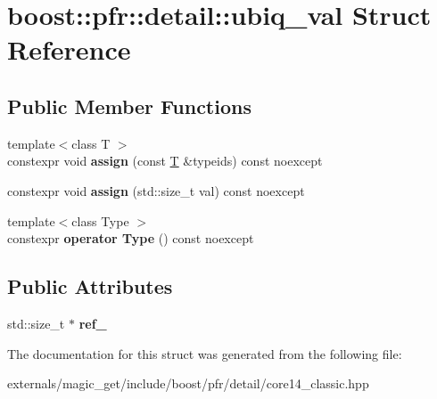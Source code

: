 \hypertarget{structboost_1_1pfr_1_1detail_1_1ubiq__val}{}\section{boost\+:\+:pfr\+:\+:detail\+:\+:ubiq\+\_\+val Struct Reference}
\label{structboost_1_1pfr_1_1detail_1_1ubiq__val}
\subsection*{Public Member Functions}
\begin{DoxyCompactItemize}
\item 
\mbox{\label{structboost_1_1pfr_1_1detail_1_1ubiq__val_aee13ced3817e53d6d5e094bb629b6422}} 
{\footnotesize template$<$class T $>$ }\\constexpr void {\bfseries assign} (const \mbox{\hyperlink{struct_t}{T}} \&typeids) const noexcept
\item 
\mbox{\label{structboost_1_1pfr_1_1detail_1_1ubiq__val_a2ee336e78819a454a80ad805d968efd8}} 
constexpr void {\bfseries assign} (std\+::size\+\_\+t val) const noexcept
\item 
\mbox{\label{structboost_1_1pfr_1_1detail_1_1ubiq__val_a46dc6b6bf10f57725235161b718113fa}} 
{\footnotesize template$<$class Type $>$ }\\constexpr {\bfseries operator Type} () const noexcept
\end{DoxyCompactItemize}
\subsection*{Public Attributes}
\begin{DoxyCompactItemize}
\item 
\mbox{\label{structboost_1_1pfr_1_1detail_1_1ubiq__val_a692731e683ef1f15c1a50f9ef0384191}} 
std\+::size\+\_\+t $\ast$ {\bfseries ref\+\_\+}
\end{DoxyCompactItemize}


The documentation for this struct was generated from the following file\+:\begin{DoxyCompactItemize}
\item 
externals/magic\+\_\+get/include/boost/pfr/detail/core14\+\_\+classic.\+hpp\end{DoxyCompactItemize}
